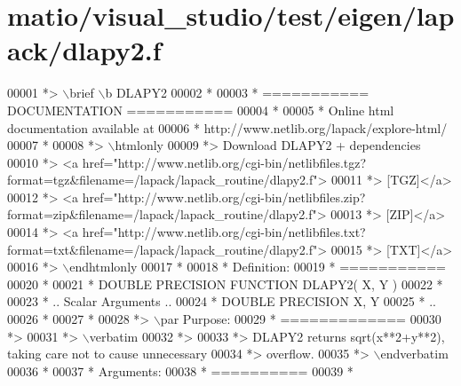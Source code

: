 \hypertarget{matio_2visual__studio_2test_2eigen_2lapack_2dlapy2_8f_source}{}\section{matio/visual\+\_\+studio/test/eigen/lapack/dlapy2.f}
\label{matio_2visual__studio_2test_2eigen_2lapack_2dlapy2_8f_source}

\begin{DoxyCode}
00001 \textcolor{comment}{*> \(\backslash\)brief \(\backslash\)b DLAPY2}
00002 \textcolor{comment}{*}
00003 \textcolor{comment}{*  =========== DOCUMENTATION ===========}
00004 \textcolor{comment}{*}
00005 \textcolor{comment}{* Online html documentation available at }
00006 \textcolor{comment}{*            http://www.netlib.org/lapack/explore-html/ }
00007 \textcolor{comment}{*}
00008 \textcolor{comment}{*> \(\backslash\)htmlonly}
00009 \textcolor{comment}{*> Download DLAPY2 + dependencies }
00010 \textcolor{comment}{*> <a
       href="http://www.netlib.org/cgi-bin/netlibfiles.tgz?format=tgz&filename=/lapack/lapack\_routine/dlapy2.f"> }
00011 \textcolor{comment}{*> [TGZ]</a> }
00012 \textcolor{comment}{*> <a
       href="http://www.netlib.org/cgi-bin/netlibfiles.zip?format=zip&filename=/lapack/lapack\_routine/dlapy2.f"> }
00013 \textcolor{comment}{*> [ZIP]</a> }
00014 \textcolor{comment}{*> <a
       href="http://www.netlib.org/cgi-bin/netlibfiles.txt?format=txt&filename=/lapack/lapack\_routine/dlapy2.f"> }
00015 \textcolor{comment}{*> [TXT]</a>}
00016 \textcolor{comment}{*> \(\backslash\)endhtmlonly }
00017 \textcolor{comment}{*}
00018 \textcolor{comment}{*  Definition:}
00019 \textcolor{comment}{*  ===========}
00020 \textcolor{comment}{*}
00021 \textcolor{comment}{*       DOUBLE PRECISION FUNCTION DLAPY2( X, Y )}
00022 \textcolor{comment}{* }
00023 \textcolor{comment}{*       .. Scalar Arguments ..}
00024 \textcolor{comment}{*       DOUBLE PRECISION   X, Y}
00025 \textcolor{comment}{*       ..}
00026 \textcolor{comment}{*  }
00027 \textcolor{comment}{*}
00028 \textcolor{comment}{*> \(\backslash\)par Purpose:}
00029 \textcolor{comment}{*  =============}
00030 \textcolor{comment}{*>}
00031 \textcolor{comment}{*> \(\backslash\)verbatim}
00032 \textcolor{comment}{*>}
00033 \textcolor{comment}{*> DLAPY2 returns sqrt(x**2+y**2), taking care not to cause unnecessary}
00034 \textcolor{comment}{*> overflow.}
00035 \textcolor{comment}{*> \(\backslash\)endverbatim}
00036 \textcolor{comment}{*}
00037 \textcolor{comment}{*  Arguments:}
00038 \textcolor{comment}{*  ==========}
00039 \textcolor{comment}{*}

\end{DoxyCode}
